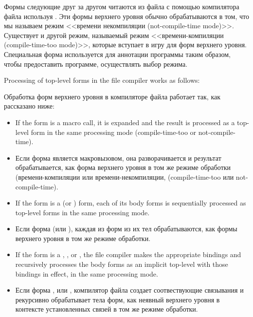 \begin{newer}
\begin{defspec}
  Формы следующие друг за другом читаются из файла с помощью компилятора файла
  используя . Эти формы верхнего уровня обычно обрабатываются в том,
  что мы называем режим <<времени некомпиляции (not-compile-time
  mode)>>. Существует и другой режим, называемый режим <<времени-компиляции
  (compile-time-too mode)>>, которые вступает в игру для форм верхнего
  уровня. Специальная форма  используется для аннотации программы
  таким образом, чтобы предоставить программе, осуществлять выбор режима.

  Processing of top-level forms in the file compiler works as follows:


  Обработка форм верхнего уровня в компиляторе файла работает так, как
  рассказано ниже:

\begin{itemize}
   \item If the form is a macro call, it is expanded and the result is
     processed as a top-level form in the same processing mode
     (compile-time-too or not-compile-time).

   \item Если форма является макровызовом, она разворачивается и результат
     обрабатывается, как форма верхнего уровня в том же режиме обработки
     (времени-компиляции или времени-некомпиляции, (compile-time-too или not-compile-time).

   \item If the form is a  (or  )
     form, each of its body forms is
     sequentially processed as top-level forms in the same processing
     mode.

   \item Если форма  (или ), каждая из форм из их тел
     обрабатываются, как формы верхнего уровня в том же режиме обработки.

   \item If the form is a , ,
     or ,
     the file compiler makes the appropriate bindings and recursively
     processes the body forms as an implicit top-level  with those 
     bindings in effect, in the same processing mode.

   \item Если форма ,  или
     , компилятор файла создает соотвествующие связывания и
     рекурсивно обрабатывает тела форм, как неявный  верхнего уровня
     в контексте установленных связей в том же режиме обработки.


\end{itemize}
\end{defspec}
\end{newer}
